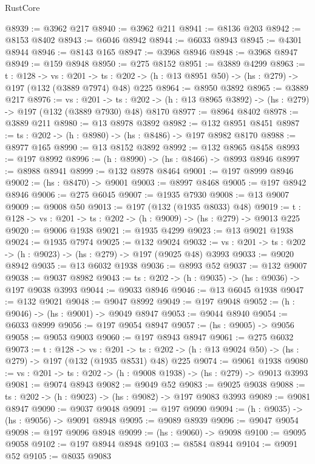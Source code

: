 \begin{lexlean}{RustCore}
\begin{coremodule}
@8939 := @3962 @217
@8940 := @3962 @211
@8941 := @8136 @203
@8942 := @8153 @8402
@8943 := @6046 @8942
@8944 := @6033 @8943
@8945 := @4301 @8944
@8946 := @8143 @165
@8947 := @3968 @8946
@8948 := @3968 @8947
@8949 := @159 @8948
@8950 := @275 @8152
@8951 := @3889 @4299
@8963 := {t : @128} ->
  {vs : @201} ->
  {ts : @202} -> (h : @13 @8951 @50) -> (hs : @279) -> @197 (@132 (@3889 @7974) @48) @225
@8964 := @8950 @3892
@8965 := @3889 @217
@8976 := {vs : @201} ->
  {ts : @202} -> (h : @13 @8965 @3892) -> (hs : @279) -> @197 (@132 (@3889 @7930) @48) @8170
@8977 := @8964 @8402
@8978 := @3889 @211
@8980 := @13 @8978 @3892
@8982 := @132 @8951 @8451
@8987 := {ts : @202} -> (h : @8980) -> (hs : @8486) -> @197 @8982 @8170
@8988 := @8977 @165
@8990 := @13 @8152 @3892
@8992 := @132 @8965 @8458
@8993 := @197 @8992
@8996 := (h : @8990) -> (hs : @8466) -> @8993 @8946
@8997 := @8988 @8941
@8999 := @132 @8978 @8464
@9001 := @197 @8999 @8946
@9002 := (hs : @8470) -> @9001
@9003 := @8997 @8468
@9005 := @197 @8942 @8946
@9006 := @275 @6045
@9007 := @1935 @7930
@9008 := @13 @9007
@9009 := @9008 @50
@9013 := @197 (@132 (@1935 @8033) @48)
@9019 := {t : @128} -> {vs : @201} -> {ts : @202} -> (h : @9009) -> (hs : @279) -> @9013 @225
@9020 := @9006 @1938
@9021 := @1935 @4299
@9023 := @13 @9021 @1938
@9024 := @1935 @7974
@9025 := @132 @9024
@9032 := {vs : @201} -> {ts : @202} -> (h : @9023) -> (hs : @279) -> @197 (@9025 @48) @3993
@9033 := @9020 @8942
@9035 := @13 @6032 @1938
@9036 := @8993 @52
@9037 := @132 @9007
@9038 := @9037 @8982
@9043 := {ts : @202} -> (h : @9035) -> (hs : @9036) -> @197 @9038 @3993
@9044 := @9033 @8946
@9046 := @13 @6045 @1938
@9047 := @132 @9021
@9048 := @9047 @8992
@9049 := @197 @9048
@9052 := (h : @9046) -> (hs : @9001) -> @9049 @8947
@9053 := @9044 @8940
@9054 := @6033 @8999
@9056 := @197 @9054 @8947
@9057 := (hs : @9005) -> @9056
@9058 := @9053 @9003
@9060 := @197 @8943 @8947
@9061 := @275 @6032
@9073 := {t : @128} ->
  {vs : @201} ->
  {ts : @202} -> (h : @13 @9024 @50) -> (hs : @279) -> @197 (@132 (@1935 @8531) @48) @225
@9074 := @9061 @1938
@9080 := {vs : @201} -> {ts : @202} -> (h : @9008 @1938) -> (hs : @279) -> @9013 @3993
@9081 := @9074 @8943
@9082 := @9049 @52
@9083 := @9025 @9038
@9088 := {ts : @202} -> (h : @9023) -> (hs : @9082) -> @197 @9083 @3993
@9089 := @9081 @8947
@9090 := @9037 @9048
@9091 := @197 @9090
@9094 := (h : @9035) -> (hs : @9056) -> @9091 @8948
@9095 := @9089 @8939
@9096 := @9047 @9054
@9098 := @197 @9096 @8948
@9099 := (hs : @9060) -> @9098
@9100 := @9095 @9058
@9102 := @197 @8944 @8948
@9103 := @8584 @8944
@9104 := @9091 @52
@9105 := @8035 @9083

\end{coremodule}
\end{lexlean}
